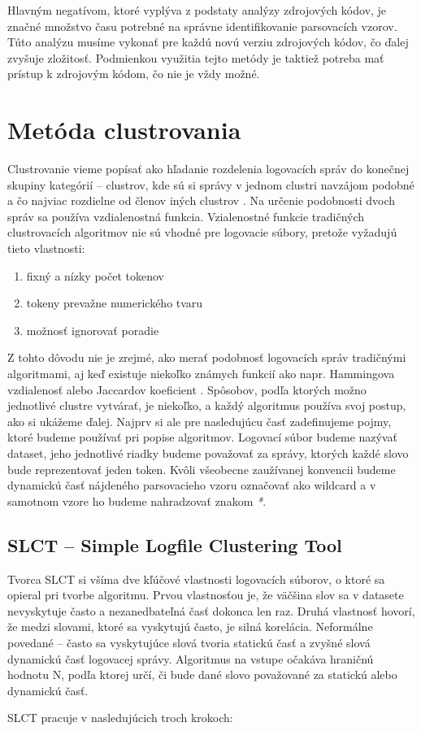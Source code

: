 Hlavným negatívom, ktoré vyplýva z podstaty analýzy zdrojových kódov, je značné množstvo času potrebné na správne identifikovanie parsovacích vzorov. Túto analýzu musíme vykonať pre každú novú verziu zdrojových kódov, čo ďalej zvyšuje zložitosť. Podmienkou využitia tejto metódy je taktiež potreba mať prístup k zdrojovým kódom, čo nie je vždy možné. 

\section{ Metóda clustrovania}

Clustrovanie vieme popísať ako hľadanie rozdelenia logovacích správ do konečnej skupiny kategórií -- clustrov, kde sú si správy v jednom clustri navzájom podobné a čo najviac rozdielne od členov iných clustrov  \parencite{iplom}. Na určenie podobnosti dvoch správ sa používa vzdialenostná funkcia. Vzialenostné funkcie tradičných clustrovacích algoritmov nie sú vhodné pre logovacie súbory, pretože vyžadujú tieto vlastnosti:

\begin{enumerate}
  \item fixný a nízky počet tokenov
  \item tokeny prevažne numerického tvaru
  \item možnosť ignorovať poradie
\end{enumerate}

Z tohto dôvodu nie je zrejmé, ako merať podobnosť logovacích správ tradičnými algoritmami, aj keď existuje niekoľko známych funkcií ako napr. Hammingova vzdialenosť alebo Jaccardov koeficient \parencite{slct}. Spôsobov, podľa ktorých možno jednotlivé clustre vytvárať, je niekoľko, a každý algoritmus používa svoj postup, ako si ukážeme ďalej. Najprv si ale pre nasledujúcu časť zadefinujeme pojmy, ktoré budeme používať pri popise algoritmov. Logovací súbor budeme nazývať dataset, jeho jednotlivé riadky budeme považovať za správy, ktorých každé slovo bude reprezentovať jeden token. Kvôli všeobecne zaužívanej konvencii budeme dynamickú časť nájdeného parsovacieho vzoru označovať ako wildcard a v samotnom vzore ho budeme nahradzovať znakom \emph{*}.

\subsection{SLCT -- Simple Logfile Clustering Tool}
Tvorca SLCT \parencite{slct, slctloghound} si všíma dve kľúčové vlastnosti logovacích súborov, o ktoré sa opieral pri tvorbe algoritmu. Prvou vlastnosťou je, že väčšina slov sa v datasete nevyskytuje často a nezanedbateľná časť dokonca len raz. Druhá vlastnosť hovorí, že medzi slovami, ktoré sa vyskytujú často, je silná korelácia. Neformálne povedané -- často sa vyskytujúce slová tvoria statickú časť a zvyšné slová dynamickú časť logovacej správy. Algoritmus na vstupe očakáva hraničnú hodnotu N, podľa ktorej určí, či bude dané slovo považované za statickú alebo dynamickú časť. 
\par SLCT pracuje v nasledujúcich troch krokoch:

